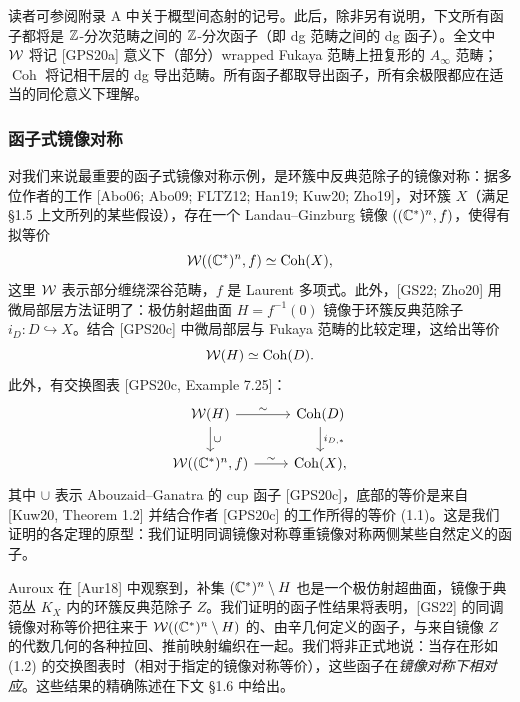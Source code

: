 读者可参阅附录 A 中关于概型间态射的记号。此后，除非另有说明，下文所有函子都将是 $\mathbb{Z}$-分次范畴之间的 $\mathbb{Z}$-分次函子（即 dg 范畴之间的 dg 函子）。全文中 $\mathcal{W}$ 将记 [GPS20a] 意义下（部分）wrapped Fukaya 范畴上扭复形的 $A_\infty$ 范畴；$\operatorname{Coh}$ 将记相干层的 dg 导出范畴。所有函子都取导出函子，所有余极限都应在适当的同伦意义下理解。

\subsubsection{函子式镜像对称}

对我们来说最重要的函子式镜像对称示例，是环簇中反典范除子的镜像对称：据多位作者的工作 [Abo06; Abo09; FLTZ12; Han19; Kuw20; Zho19]，对环簇 $X$（满足 §1.5 上文所列的某些假设），存在一个 Landau–Ginzburg 镜像 $((\mathbb{C}^*)^n,f)$，使得有拟等价
\begin{equation}\label{eq:lvl-hms}
\mathcal{W}((\mathbb{C}^*)^n,f)\simeq\operatorname{Coh}(X),
\end{equation}
这里 $\mathcal{W}$ 表示部分缠绕深谷范畴，$f$ 是 Laurent 多项式。此外，[GS22; Zho20] 用微局部层方法证明了：极仿射超曲面 $H=f^{-1}(0)$ 镜像于环簇反典范除子 $i_D\colon D\hookrightarrow X$。结合 [GPS20c] 中微局部层与 Fukaya 范畴的比较定理，这给出等价
\[
\mathcal{W}(H)\simeq\operatorname{Coh}(D).
\]
此外，有交换图表 [GPS20c, Example 7.25]：
\begin{equation}\label{eq:cup-square}
\begin{tikzcd}
\cW(H) \arrow[r,"\sim"] \arrow[d,"\cup"] & \operatorname{Coh}(D) \arrow[d,"i_{D,*}"] \\
\cW((\C^*)^n,f) \arrow[r,"\sim"] & \operatorname{Coh}(X),
\end{tikzcd}
\end{equation}
其中 $\cup$ 表示 Abouzaid–Ganatra 的 cup 函子 [GPS20c]，底部的等价是来自 [Kuw20, Theorem 1.2] 并结合作者 [GPS20c] 的工作所得的等价 (1.1)。这是我们证明的各定理的原型：我们证明同调镜像对称尊重镜像对称两侧某些自然定义的函子。


Auroux 在 [Aur18] 中观察到，补集 $(\mathbb{C}^*)^n\setminus H$ 也是一个极仿射超曲面，镜像于典范丛 $K_X$ 内的环簇反典范除子 $Z$。我们证明的函子性结果将表明，[GS22] 的同调镜像对称等价把往来于 $\mathcal{W}((\mathbb{C}^*)^n\setminus H)$ 的、由辛几何定义的函子，与来自镜像 $Z$ 的代数几何的各种拉回、推前映射编织在一起。我们将非正式地说：当存在形如 (1.2) 的交换图表时（相对于指定的镜像对称等价），这些函子在\emph{镜像对称下相对应}。这些结果的精确陈述在下文 §1.6 中给出。
